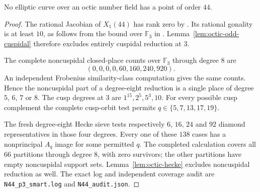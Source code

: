 \begin{proposition}\label{prop:octic44}
No elliptic curve over an octic number field has a point of order $44$.
\end{proposition}
\begin{proof}
The rational Jacobian of $X_1(44)$ has rank zero by
\cite[Theorem~3.1(2)]{DEHMZ}. Its rational gonality is at least $10$,
as follows from the bound over $\mathbb F_3$ in \cite[Table~1]{NV}.
Lemma~\ref{lem:octic-odd-cuspidal} therefore excludes entirely
cuspidal reduction at $3$.

The complete noncuspidal closed-place counts over $\mathbb F_3$
through degree $8$ are
\[
 (0,0,0,0,60,160,240,920).
\]
An independent Frobenius similarity-class computation gives the same
counts. Hence the noncuspidal part of a degree-eight reduction is a
single place of degree $5$, $6$, $7$ or $8$.
The cusp degrees at $3$ are $1^{15},2^5,5^3,10$.
For every possible cusp complement the complete cusp-orbit test
permits $q\in\{5,7,13,17,19\}$.

The fresh degree-eight Hecke sieve tests respectively $6$, $16$,
$24$ and $92$ diamond representatives in those four degrees.
Every one of these $138$ cases has a nonprincipal $A_q$ image for
some permitted $q$. The completed calculation covers all $66$
partitions through degree $8$, with zero survivors; the other
partitions have empty noncuspidal support sets.
Lemma~\ref{lem:octic-hecke} excludes noncuspidal reduction as well.
The exact log and independent coverage audit are
\texttt{N44\_p3\_smart.log} and \texttt{N44\_audit.json}.
\end{proof}

